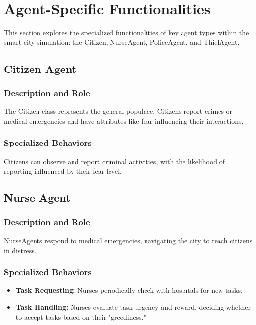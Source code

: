 \documentclass[conference]{IEEEtran}
\begin{document}
  
  \section{Agent-Specific Functionalities}
  This section explores the specialized functionalities of key agent types within the smart city simulation: the Citizen, NurseAgent, PoliceAgent, and ThiefAgent.
  
  \subsection{Citizen Agent}
  \subsubsection{Description and Role}
  The Citizen class represents the general populace. Citizens report crimes or medical emergencies and have attributes like fear influencing their interactions.
  
  \subsubsection{Specialized Behaviors}
  Citizens can observe and report criminal activities, with the likelihood of reporting influenced by their fear level.
  
  \subsection{Nurse Agent}
  \subsubsection{Description and Role}
  NurseAgents respond to medical emergencies, navigating the city to reach citizens in distress.
  
  \subsubsection{Specialized Behaviors}
  \begin{itemize}
  \item \textbf{Task Requesting:} Nurses periodically check with hospitals for new tasks.
  \item \textbf{Task Handling:} Nurses evaluate task urgency and reward, deciding whether to accept tasks based on their "greediness."
  \end{itemize}
  
\end{document}
